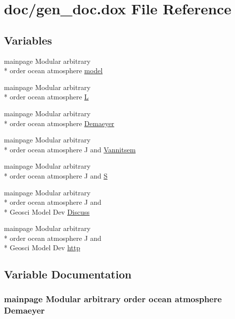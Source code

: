 \hypertarget{gen__doc_8dox}{\section{doc/gen\-\_\-doc.dox File Reference}
\label{gen__doc_8dox}
}
\subsection*{Variables}
\begin{DoxyCompactItemize}
\item 
mainpage Modular arbitrary \\*
order ocean atmosphere \hyperlink{gen__doc_8dox_a3c7b45657e3d2c921eb484207480cab6}{model}
\item 
mainpage Modular arbitrary \\*
order ocean atmosphere \hyperlink{gen__doc_8dox_ad4624cc5079269009eae5ce9767cadce}{L}
\item 
mainpage Modular arbitrary \\*
order ocean atmosphere \hyperlink{gen__doc_8dox_a86afd927a3a494198d083defb4981233}{Demaeyer}
\item 
mainpage Modular arbitrary \\*
order ocean atmosphere J and \hyperlink{gen__doc_8dox_a45b01a572421d9a881db9eb486a6ac2d}{Vannitsem}
\item 
mainpage Modular arbitrary \\*
order ocean atmosphere J and \hyperlink{gen__doc_8dox_ad6615f0ea32be50cff16a93bb5228d22}{S}
\item 
mainpage Modular arbitrary \\*
order ocean atmosphere J and \\*
Geosci Model Dev \hyperlink{gen__doc_8dox_ac36dc9198b702d0d482aefdc388d1cee}{Discuss}
\item 
mainpage Modular arbitrary \\*
order ocean atmosphere J and \\*
Geosci Model Dev \hyperlink{gen__doc_8dox_a5a04d589377871736f2225deb4a3287f}{http}
\end{DoxyCompactItemize}


\subsection{Variable Documentation}
\hypertarget{gen__doc_8dox_a86afd927a3a494198d083defb4981233}{
\subsubsection[{Demaeyer}]{\setlength{\rightskip}{0pt plus 5cm}mainpage Modular arbitrary order ocean atmosphere Demaeyer}}\label{gen__doc_8dox_a86afd927a3a494198d083defb4981233}


